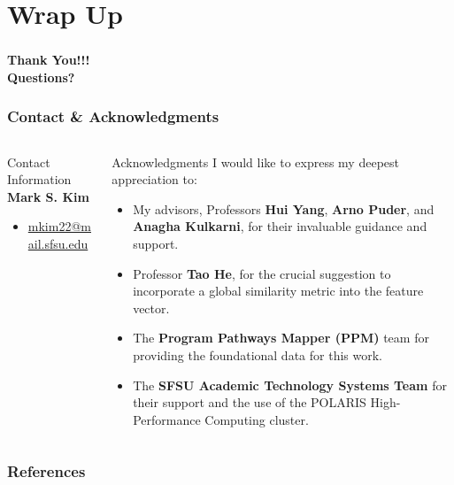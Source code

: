 \documentclass[aspectratio=169,10pt]{beamer}
\begin{document}
\section{Wrap Up}

\begin{frame}
    \frametitle{} %
    \vfill %
    \centering
    {\Huge \textbf{Thank You!!!}}\\
    \vspace{5em}
    {\Huge \textbf{Questions?}}
    \vfill
\end{frame}

\begin{frame}
    \frametitle{Contact \& Acknowledgments}
    \fontsize{9}{9}\selectfont
    
    \begin{columns}[T]
        \begin{column}{0.25\textwidth}
            \begin{block}{Contact Information}
                \textbf{Mark S. Kim}
                \begin{itemize}
                    \item \href{mailto:mkim22@mail.sfsu.edu}{mkim22@mail.sfsu.edu}
                \end{itemize}
            \end{block}
        \end{column}
        
        \begin{column}{0.6\textwidth}
            \begin{block}{Acknowledgments}
                I would like to express my deepest appreciation to:
                \begin{itemize}
                    \item My advisors, Professors \textbf{Hui Yang}, \textbf{Arno Puder}, and \textbf{Anagha Kulkarni}, for their invaluable guidance and support.
                    \item Professor \textbf{Tao He}, for the crucial suggestion to incorporate a global similarity metric into the feature vector.
                    \item The \textbf{Program Pathways Mapper (PPM)} team for providing the foundational data for this work.
                    \item The \textbf{SFSU Academic Technology Systems Team} for their support and the use of the POLARIS High-Performance Computing cluster.
                \end{itemize}
            \end{block}
        \end{column}
    \end{columns}
\end{frame}

\begin{frame}[allowframebreaks]
    \frametitle{References}
    \printbibliography
\end{frame}
\end{document}
